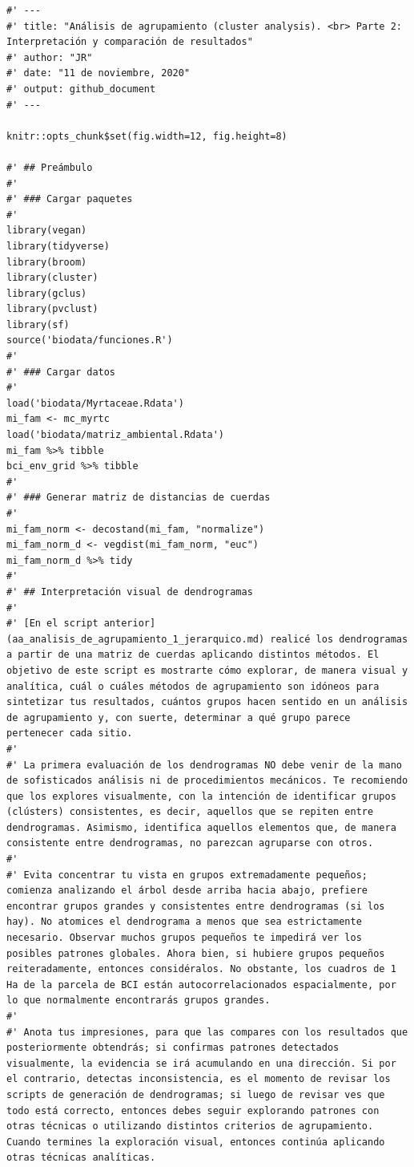 \documentclass[11pt,]{article}
\begin{document}
\begin{verbatim}
#' ---
#' title: "Análisis de agrupamiento (cluster analysis). <br> Parte 2: Interpretación y comparación de resultados"
#' author: "JR"
#' date: "11 de noviembre, 2020"
#' output: github_document
#' ---

knitr::opts_chunk$set(fig.width=12, fig.height=8)

#' ## Preámbulo
#' 
#' ### Cargar paquetes
#' 
library(vegan)
library(tidyverse)
library(broom)
library(cluster)
library(gclus)
library(pvclust)
library(sf)
source('biodata/funciones.R')
#' 
#' ### Cargar datos
#' 
load('biodata/Myrtaceae.Rdata')
mi_fam <- mc_myrtc
load('biodata/matriz_ambiental.Rdata')
mi_fam %>% tibble
bci_env_grid %>% tibble
#' 
#' ### Generar matriz de distancias de cuerdas
#' 
mi_fam_norm <- decostand(mi_fam, "normalize")
mi_fam_norm_d <- vegdist(mi_fam_norm, "euc")
mi_fam_norm_d %>% tidy
#' 
#' ## Interpretación visual de dendrogramas
#' 
#' [En el script anterior](aa_analisis_de_agrupamiento_1_jerarquico.md) realicé los dendrogramas a partir de una matriz de cuerdas aplicando distintos métodos. El objetivo de este script es mostrarte cómo explorar, de manera visual y analítica, cuál o cuáles métodos de agrupamiento son idóneos para sintetizar tus resultados, cuántos grupos hacen sentido en un análisis de agrupamiento y, con suerte, determinar a qué grupo parece pertenecer cada sitio.
#' 
#' La primera evaluación de los dendrogramas NO debe venir de la mano de sofisticados análisis ni de procedimientos mecánicos. Te recomiendo que los explores visualmente, con la intención de identificar grupos (clústers) consistentes, es decir, aquellos que se repiten entre dendrogramas. Asimismo, identifica aquellos elementos que, de manera consistente entre dendrogramas, no parezcan agruparse con otros.
#' 
#' Evita concentrar tu vista en grupos extremadamente pequeños; comienza analizando el árbol desde arriba hacia abajo, prefiere encontrar grupos grandes y consistentes entre dendrogramas (si los hay). No atomices el dendrograma a menos que sea estrictamente necesario. Observar muchos grupos pequeños te impedirá ver los posibles patrones globales. Ahora bien, si hubiere grupos pequeños reiteradamente, entonces considéralos. No obstante, los cuadros de 1 Ha de la parcela de BCI están autocorrelacionados espacialmente, por lo que normalmente encontrarás grupos grandes.
#' 
#' Anota tus impresiones, para que las compares con los resultados que posteriormente obtendrás; si confirmas patrones detectados visualmente, la evidencia se irá acumulando en una dirección. Si por el contrario, detectas inconsistencia, es el momento de revisar los scripts de generación de dendrogramas; si luego de revisar ves que todo está correcto, entonces debes seguir explorando patrones con otras técnicas o utilizando distintos criterios de agrupamiento. Cuando termines la exploración visual, entonces continúa aplicando otras técnicas analíticas.

\end{verbatim}
\end{document}
